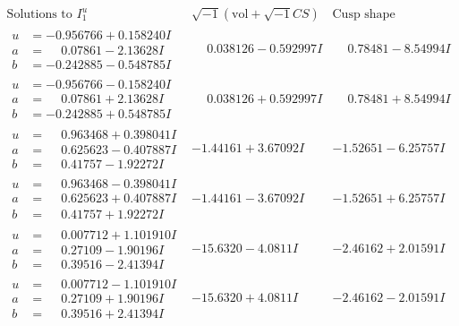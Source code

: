 \documentclass[1p]{elsarticle_modified}
\theoremstyle{definition}
\newcommand{\I}{\sqrt{-1}}
\begin{document}
$$\begin{array}{c|c|c}  
\text{Solutions to }I^u_{1}& \I (\text{vol} + \sqrt{-1}CS) & \text{Cusp shape}\\
 \hline 
\begin{aligned}
u &= -0.956766 + 0.158240 I \\
a &= \phantom{-}0.07861 - 2.13628 I \\
b &= -0.242885 - 0.548785 I\end{aligned}
 & \phantom{-}0.038126 - 0.592997 I & \phantom{-}0.78481 - 8.54994 I \\ \hline\begin{aligned}
u &= -0.956766 - 0.158240 I \\
a &= \phantom{-}0.07861 + 2.13628 I \\
b &= -0.242885 + 0.548785 I\end{aligned}
 & \phantom{-}0.038126 + 0.592997 I & \phantom{-}0.78481 + 8.54994 I \\ \hline\begin{aligned}
u &= \phantom{-}0.963468 + 0.398041 I \\
a &= \phantom{-}0.625623 - 0.407887 I \\
b &= \phantom{-}0.41757 - 1.92272 I\end{aligned}
 & -1.44161 + 3.67092 I & -1.52651 - 6.25757 I \\ \hline\begin{aligned}
u &= \phantom{-}0.963468 - 0.398041 I \\
a &= \phantom{-}0.625623 + 0.407887 I \\
b &= \phantom{-}0.41757 + 1.92272 I\end{aligned}
 & -1.44161 - 3.67092 I & -1.52651 + 6.25757 I \\ \hline\begin{aligned}
u &= \phantom{-}0.007712 + 1.101910 I \\
a &= \phantom{-}0.27109 - 1.90196 I \\
b &= \phantom{-}0.39516 - 2.41394 I\end{aligned}
 & -15.6320 - 4.0811 I & -2.46162 + 2.01591 I \\ \hline\begin{aligned}
u &= \phantom{-}0.007712 - 1.101910 I \\
a &= \phantom{-}0.27109 + 1.90196 I \\
b &= \phantom{-}0.39516 + 2.41394 I\end{aligned}
 & -15.6320 + 4.0811 I & -2.46162 - 2.01591 I \\ \hline\begin{aligned}

\end{aligned}
\end{array}$$
\end{document}
